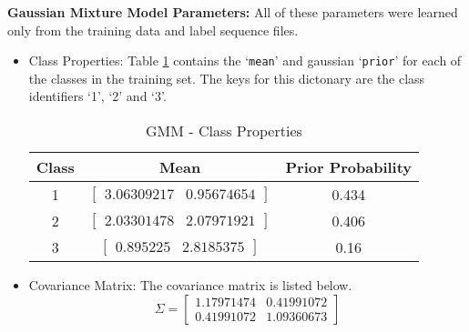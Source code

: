 \documentclass[parskip=half]{scrartcl}
\begin{document}
        \textbf{Gaussian Mixture Model Parameters:}
        All of these parameters were learned only from the training data and label sequence files.
        \begin{itemize}

            \item 
            Class Properties: Table \ref{tab:gmm_class_properties} contains the `\texttt{mean}' and gaussian `\texttt{prior}' for each of the classes in the training set. The keys for this dictonary are the class identifiers `1', `2' and `3'.
            \begin{table}[ht]
                \centering
                \begin{tabular}{| c | c | c |}
                \hline
                \textbf{Class} & \textbf{Mean} & \textbf{Prior Probability} \\
                \hline
                \hline
                    1 & $\begin{bmatrix}3.06309217 & 0.95674654\end{bmatrix}$ & 0.434 \\
                \hline
                    2 & $\begin{bmatrix}2.03301478 & 2.07971921\end{bmatrix}$ & 0.406 \\
                \hline
                    3 & $\begin{bmatrix}0.895225 & 2.8185375\end{bmatrix}$ & 0.16 \\
                \hline
                \end{tabular}
                \caption{GMM - Class Properties}
                \label{tab:gmm_class_properties}
            \end{table}
            \item 
            Covariance Matrix: The covariance matrix is listed below. 
            $$\Sigma = 
                \begin{bmatrix}
                    1.17971474 & 0.41991072 \\
                    0.41991072 & 1.09360673 
                \end{bmatrix}$$

        \end{itemize}
    
\end{document}
